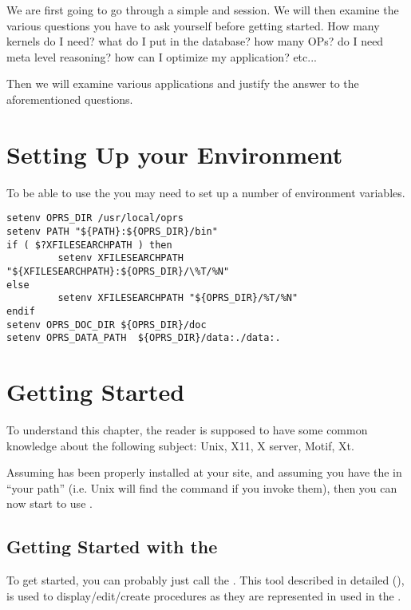 We are first going to go through a simple \OPE{} and \XPK{} session. We
will then  examine the various questions you have to ask
yourself before getting started. How many kernels do I need? what do I
put in the database? how many OPs? do I need meta level reasoning? how
can I optimize my application? etc...

Then we will examine various applications and justify the answer to the
aforementioned questions.

\chapter{Setting Up your Environment}

To be able to use the \COPRSDE{} you may need to set up a number of environment
variables.

\begin{verbatim}
setenv OPRS_DIR /usr/local/oprs
setenv PATH "${PATH}:${OPRS_DIR}/bin"
if ( $?XFILESEARCHPATH ) then
         setenv XFILESEARCHPATH "${XFILESEARCHPATH}:${OPRS_DIR}/\%T/%N"
else
         setenv XFILESEARCHPATH "${OPRS_DIR}/%T/%N"
endif
setenv OPRS_DOC_DIR ${OPRS_DIR}/doc
setenv OPRS_DATA_PATH  ${OPRS_DIR}/data:./data:.
\end{verbatim}

\chapter{Getting Started}

To understand this chapter, the reader is supposed to have some common
knowledge about the following subject: Unix, X11, X server, Motif, Xt. 

Assuming \COPRSDE{} has been properly installed at your site, and assuming
you have the \COPRSDE{} in ``your path'' (i.e. Unix will find the command
if you invoke them), then you can now start to use \COPRS{}.



\section{Getting Started with the \OPE{}}

To get started, you can probably just call the \OPE{}. This tool described in
detailed (), is used to display/edit/create
procedures as they are represented in used in the \COPRSDE{}.


